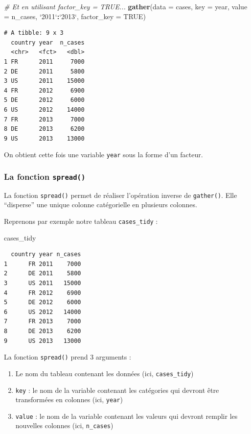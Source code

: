 \documentclass[a4paperpaper,]{article}
\newenvironment{Shaded}{\begin{snugshade}}{\end{snugshade}}
\newcommand{\KeywordTok}[1]{\textcolor[rgb]{0.13,0.29,0.53}{\textbf{#1}}}
\newcommand{\DataTypeTok}[1]{\textcolor[rgb]{0.13,0.29,0.53}{#1}}
\newcommand{\StringTok}[1]{\textcolor[rgb]{0.31,0.60,0.02}{#1}}
\newcommand{\CommentTok}[1]{\textcolor[rgb]{0.56,0.35,0.01}{\textit{#1}}}
\newcommand{\OtherTok}[1]{\textcolor[rgb]{0.56,0.35,0.01}{#1}}
\newcommand{\OperatorTok}[1]{\textcolor[rgb]{0.81,0.36,0.00}{\textbf{#1}}}
\newcommand{\NormalTok}[1]{#1}
\providecommand{\tightlist}{%
  \setlength{\itemsep}{0pt}\setlength{\parskip}{0pt}}
\theoremstyle{definition}
\theoremstyle{definition}
\theoremstyle{definition}
\theoremstyle{remark}
\begin{document}
\begin{Shaded}
\begin{Highlighting}[]
\CommentTok{# Et en utilisant factor_key = TRUE...}
\KeywordTok{gather}\NormalTok{(}\DataTypeTok{data =}\NormalTok{ cases, }\DataTypeTok{key =}\NormalTok{ year, }\DataTypeTok{value =}\NormalTok{ n_cases, }\StringTok{`}\DataTypeTok{2011}\StringTok{`}\OperatorTok{:}\StringTok{`}\DataTypeTok{2013}\StringTok{`}\NormalTok{, }\DataTypeTok{factor_key =} \OtherTok{TRUE}\NormalTok{)}
\end{Highlighting}
\end{Shaded}

\begin{verbatim}
# A tibble: 9 x 3
  country year  n_cases
  <chr>   <fct>   <dbl>
1 FR      2011     7000
2 DE      2011     5800
3 US      2011    15000
4 FR      2012     6900
5 DE      2012     6000
6 US      2012    14000
7 FR      2013     7000
8 DE      2013     6200
9 US      2013    13000
\end{verbatim}

On obtient cette fois une variable \texttt{year} sous la forme d'un
facteur.

\subsubsection{\texorpdfstring{La fonction
\texttt{spread()}}{La fonction spread()}}\label{spread}

La fonction \texttt{spread()} permet de réaliser l'opération inverse de
\texttt{gather()}. Elle ``disperse'' une unique colonne catégorielle en
plusieurs colonnes.

Reprenons par exemple notre tableau \texttt{cases\_tidy} :

\begin{Shaded}
\begin{Highlighting}[]
\NormalTok{cases_tidy}
\end{Highlighting}
\end{Shaded}

\begin{verbatim}
  country year n_cases
1      FR 2011    7000
2      DE 2011    5800
3      US 2011   15000
4      FR 2012    6900
5      DE 2012    6000
6      US 2012   14000
7      FR 2013    7000
8      DE 2013    6200
9      US 2013   13000
\end{verbatim}

La fonction \texttt{spread()} prend 3 arguments :

\begin{enumerate}
\def\labelenumi{\arabic{enumi}.}
\tightlist
\item
  Le nom du tableau contenant les données (ici, \texttt{cases\_tidy})
\item
  \texttt{key} : le nom de la variable contenant les catégories qui
  devront être transformées en colonnes (ici, \texttt{year})
\item
  \texttt{value} : le nom de la variable contenant les valeurs qui
  devront remplir les nouvelles colonnes (ici, \texttt{n\_cases})
\end{enumerate}
\end{document}
